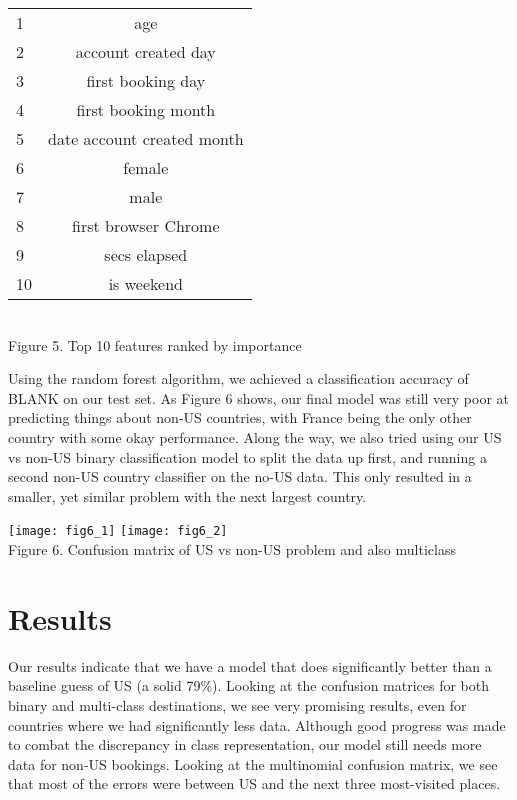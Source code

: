 \documentclass[a4paper, 11pt]{article}
\begin{document}
\begin{center}
\begin{tabular}{ l | c }
  1 & age \\
  2 & account created day \\
  3 & first booking day \\
  4 & first booking month \\
  5 & date account created month \\
  6 & female \\
  7 & male \\
  8 & first browser Chrome \\
  9 & secs elapsed \\
  10 & is weekend \\
\end{tabular} \\
Figure 5. Top 10 features ranked by importance
\end{center}

\par
Using the random forest algorithm, we achieved a classification accuracy of BLANK on our test set. As Figure 6 shows, our final model was still very poor at predicting things about non-US countries, with France being the only other country with some okay performance. Along the way, we also tried using our US vs non-US binary classification model to split the data up first, and running a second non-US country classifier on the no-US data. This only resulted in a smaller, yet similar problem with the next largest country.

\begin{center}
\texttt{[image: fig6\_1]}
\texttt{[image: fig6\_2]} \\
Figure 6. Confusion matrix of US vs non-US problem and also multiclass
\end{center}

\section*{Results}
\par
Our results indicate that we have a model that does significantly better than a baseline guess of US (a solid 79\%). Looking at the confusion matrices for both binary and multi-class destinations, we see very promising results, even for countries where we had significantly less data. Although good progress was made to combat the discrepancy in class representation, our model still needs more data for non-US bookings. Looking at the multinomial confusion matrix, we see that most of the errors were between US and the next three most-visited places.
\end{document}

